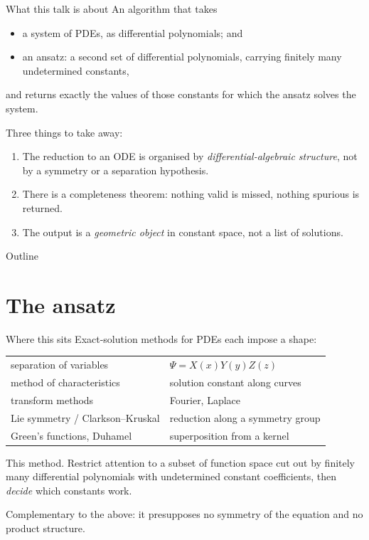 \documentclass[10pt,aspectratio=169]{beamer}
\begin{document}
\begin{frame}{What this talk is about}
An algorithm that takes

\begin{itemize}
  \item a system of PDEs, as differential polynomials; and
  \item an \alert{ansatz}: a second set of differential polynomials, carrying
        finitely many undetermined constants,
\end{itemize}

and returns \alert{exactly} the values of those constants for which the ansatz
solves the system.

\pause
\bigskip
Three things to take away:
\begin{enumerate}
  \item The reduction to an ODE is organised by \emph{differential-algebraic
        structure}, not by a symmetry or a separation hypothesis.
  \item There is a \alert{completeness theorem}: nothing valid is missed, nothing
        spurious is returned.
  \item The output is a \emph{geometric object} in constant space, not a list of
        solutions.
\end{enumerate}
\end{frame}

\begin{frame}{Outline}
\tableofcontents
\end{frame}


\section{The ansatz}

\begin{frame}{Where this sits}
Exact-solution methods for PDEs each impose a shape:

\medskip
\begin{tabular}{ll}
  separation of variables & $\Psi = X(x)Y(y)Z(z)$ \\[2pt]
  method of characteristics & solution constant along curves \\[2pt]
  transform methods & Fourier, Laplace \\[2pt]
  Lie symmetry / Clarkson--Kruskal & reduction along a symmetry group \\[2pt]
  Green's functions, Duhamel & superposition from a kernel \\
\end{tabular}

\pause
\bigskip
\alert{This method.} Restrict attention to a subset of function space cut out by
finitely many differential polynomials with undetermined constant coefficients,
then \emph{decide} which constants work.

\medskip
Complementary to the above: it presupposes no symmetry of the equation and no
product structure.
\end{frame}
\end{document}
